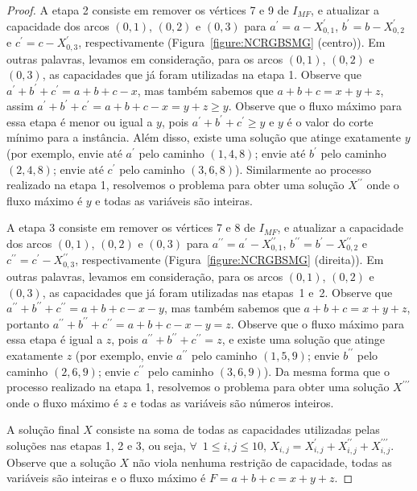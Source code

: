 \begin{proof}
A etapa 2 consiste em remover os vértices 7 e 9 de $I_{MF}$, e atualizar a capacidade dos arcos $(0,1)$, $(0,2)$ e $(0,3)$ para $a ^{\prime}=a-X^{\prime}_{0,1}$, $b^{\prime}=b-X^{\prime}_{0,2}$ e $c^{\prime} =c-X^{\prime}_{0,3}$, respectivamente (Figura~\ref{figure:NCRGBSMG} (centro)). Em outras palavras, levamos em consideração, para os arcos $(0,1)$, $(0,2)$ e $(0,3)$, as capacidades que já foram utilizadas na etapa 1. Observe que $a^{\prime}+b^{\prime}+c^{\prime} = a+b+c-x$, mas também sabemos que $a+b+c = x+y+z$, assim $a^{\prime}+b^{\prime}+c^{\prime} = a+b+c-x = y+z \geq y$. Observe que o fluxo máximo para essa etapa é menor ou igual a $y$, pois $a^{\prime}+b^{\prime}+c^{\prime} \ge y$ e $y$ é o valor do corte mínimo para a instância. Além disso, existe uma solução que atinge exatamente $y$ (por exemplo, envie até $a^{\prime}$ pelo caminho $(1,4,8)$; envie até $b^{\prime}$ pelo caminho $(2,4,8) $; envie até $c^{\prime}$ pelo caminho $(3,6,8)$). Similarmente ao processo realizado na etapa 1, resolvemos o problema para obter uma solução $X^{\prime\prime}$ onde o fluxo máximo é $y$ e todas as variáveis são inteiras.

A etapa 3 consiste em remover os vértices 7 e 8 de $I_{MF}$, e atualizar a capacidade dos arcos $(0,1)$, $(0,2)$ e $(0,3)$ para $a ^{\prime\prime}=a^{\prime}-X^{\prime\prime}_{0,1}$, $b^{\prime\prime}=b^{\prime}-X^ {\prime\prime}_{0,2}$ e $c^{\prime\prime}=c^{\prime}-X^{\prime\prime}_{0,3}$, respectivamente (Figura~\ref{figure:NCRGBSMG} (direita)). Em outras palavras, levamos em consideração, para os arcos $(0,1)$, $(0,2)$ e $(0,3)$, as capacidades que já foram utilizadas nas etapas~1 e~2. Observe que $a^{\prime\prime}+b^{\prime\prime}+c^{\prime\prime} = a+b+c-x-y$, mas também sabemos que $a+b+c = x +y+z$, portanto $a^{\prime\prime}+b^{\prime\prime}+c^{\prime\prime} = a+b+c-x-y = z$. Observe que o fluxo máximo para essa etapa é igual a $z$, pois $a^{\prime\prime}+b^{\prime\prime}+c^{\prime\prime} = z$, e existe uma solução que atinge exatamente $z$ (por exemplo, envie $a^{\prime\prime}$ pelo caminho $(1,5,9)$; envie $b^{\prime\prime}$ pelo caminho $ (2,6,9)$; envie $c^{\prime\prime}$ pelo caminho $(3,6,9)$). Da mesma forma que o processo realizado na etapa 1, resolvemos o problema para obter uma solução $X^{\prime\prime\prime}$ onde o fluxo máximo é $z$ e todas as variáveis são números inteiros.



A solução final $X$ consiste na soma de todas as capacidades utilizadas pelas soluções nas etapas 1, 2 e 3, ou seja, $\forall$~$1\leq i,j\leq 10$, $X_{i, j} = X^{\prime}_{i,j} + X^{\prime\prime}_{i,j} + X^{\prime\prime\prime}_{i,j}$. Observe que a solução $X$ não viola nenhuma restrição de capacidade, todas as variáveis são inteiras e o fluxo máximo é $F=a+b+c=x+y+z$.

\end{proof}

